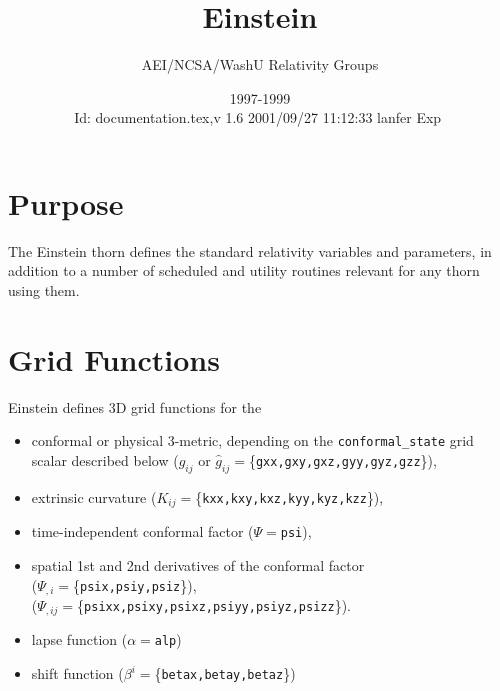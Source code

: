 \documentclass{article}
\begin{document}

\title{Einstein}
\author{AEI/NCSA/WashU Relativity Groups}
\date{1997-1999\\$ $Id: documentation.tex,v 1.6 2001/09/27 11:12:33 lanfer Exp $ $}
\maketitle



\section{Purpose}
The Einstein thorn defines the standard relativity variables and
parameters, in addition to a number of scheduled and utility routines
relevant for any thorn using them.


\section{Grid Functions}

Einstein defines 3D grid functions for the 
\begin{itemize}
\item	conformal or physical 3-metric, depending on the
	{\tt conformal\_state} grid scalar described below
	($g_{ij}$ or $\hat{g}_{ij} = $\{{\tt gxx,gxy,gxz,gyy,gyz,gzz}\}),
\item	extrinsic curvature ($K_{ij} = $\{{\tt kxx,kxy,kxz,kyy,kyz,kzz}\}), 
\item	time-independent conformal factor ($\Psi = ${\tt psi}),
\item	spatial 1st and 2nd derivatives of the conformal factor \\
	($\Psi_{,i} = $\{{\tt psix,psiy,psiz}\}), \\
	($\Psi_{,ij}= $\{{\tt psixx,psixy,psixz,psiyy,psiyz,psizz}\}).
\item	lapse function ($\alpha=${\tt alp}) 
\item	shift function ($\beta^i= $\{{\tt betax,betay,betaz}\})
\end{itemize}
\end{document}
